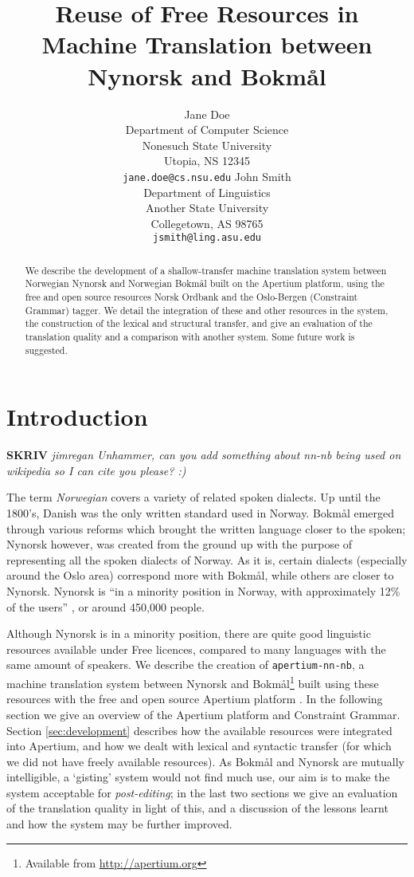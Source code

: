\documentclass[11pt]{article}
\author{Jane Doe\\  Department of Computer Science \\  Nonesuch State University \\  Utopia, NS 12345 \\  {\tt jane.doe@cs.nsu.edu} \And  John Smith \\  Department of Linguistics \\  Another State University \\  Collegetown, AS 98765 \\    {\tt jsmith@ling.asu.edu}}
\title{Reuse of Free Resources in Machine Translation between Nynorsk and Bokmål}
\newcommand{\comment}[1]{\textbf{SKRIV} {\it #1}}
\begin{document}
\maketitle

  \begin{abstract}
    We describe the development of a shallow-transfer machine
    translation system between Norwegian Nynorsk and Norwegian Bokmål
    built on the Apertium platform, using the free and open source
    resources Norsk Ordbank and the Oslo-Bergen (Constraint Grammar)
    tagger. We detail the integration of these and other resources in
    the system, the construction of the lexical and structural
    transfer, and give an evaluation of the translation quality and a
    comparison with another system. Some future work is suggested.
  \end{abstract}

\section{Introduction}
\comment{jimregan Unhammer, can you add something about nn-nb being used on wikipedia
	   so I can cite you please? :)}

The term \emph{Norwegian} covers a variety of related spoken dialects.
Up until the 1800's, Danish was the only written standard used in
Norway. Bokmål emerged through various reforms which brought the
written language closer to the spoken; Nynorsk however, was created
from the ground up with the purpose of representing all the spoken
dialects of Norway. As it is, certain dialects (especially around the
Oslo area) correspond more with Bokmål, while others are closer to
Nynorsk. Nynorsk is ``in a minority position in Norway, with
approximately 12\% of the users'' \citep{everson2000sln}, or around
450,000 people.

Although Nynorsk is in a minority position, there are quite good
linguistic resources available under Free licences, compared to many
languages with the same amount of speakers. We describe the creation
of {\tt apertium-nn-nb}, a machine translation system between Nynorsk
and Bokmål\footnote{Available from
  \href{http://apertium.org}{http://apertium.org} } built using these
resources with the free and open source Apertium platform
\citep{corbi05oss}. In the following section we give an overview of
the Apertium platform and Constraint Grammar. Section
\ref{sec:development} describes how the available resources were
integrated into Apertium, and how we dealt with lexical and syntactic
transfer (for which we did not have freely available resources). As
Bokmål and Nynorsk are mutually intelligible, a `gisting' system would
not find much use, our aim is to make the system acceptable for
\emph{post-editing}; in the last two sections we give an evaluation of
the translation quality in light of this, and a discussion of the
lessons learnt and how the system may be further improved.
\end{document}

